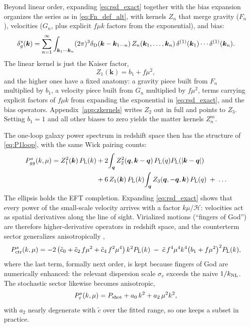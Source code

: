\documentclass[a4paper,11pt]{article}
\newcommand{\vq}{\bm{q}}
\newcommand{\vk}{\bm{k}}
\def\cH{\mathcal{H}}
\def\Plin{P_{\rm L}}
\def\knl{k_{\rm NL}}
\def\dirac{\delta_{\rm D}}
\numberwithin{equation}{section}
\begin{document}
Beyond linear order, expanding \eqref{eq:rsd_exact} together with the bias expansion organizes the series as in \eqref{eq:Fn_def_alt}, with kernels $Z_n$ that merge gravity ($F_n$), velocities ($G_n$, plus explicit $f\mu k$ factors from the exponential), and bias:
\begin{equation}
\delta_g^s(\vk) = \sum_{n=1}^{\infty}
\int_{\vk_1\cdots\vk_n}(2\pi)^3\dirac(\vk-\vk_{1\cdots n})\,
Z_n(\vk_1,\ldots,\vk_n)\,
\delta^{(1)}(\vk_1)\cdots\delta^{(1)}(\vk_n) .
\label{eq:Zn_expansion}
\end{equation}
The linear kernel is just the Kaiser factor,
\begin{equation}
Z_1(\vk) = b_1 + f\mu^2 ,
\label{eq:Z1}
\end{equation}
and the higher ones have a fixed anatomy: a gravity piece built from $F_n$ multiplied by $b_1$, a velocity piece built from $G_n$ multiplied by $f\mu^2$, terms carrying explicit factors of $f\mu k$ from expanding the exponential in \eqref{eq:rsd_exact}, and the bias operators. Appendix~\ref{app:zkernels} writes $Z_2$ out in full and points to $Z_3$. Setting $b_1 = 1$ and all other biases to zero yields the matter kernels $Z_n^m$.

The one-loop galaxy power spectrum in redshift space then has the structure of \eqref{eq:P1loop}, with the same Wick pairing counts:
\begin{align}
P_{gg}^{s}(k,\mu) = Z_1^2(\vk)\,\Plin(k)
&+ 2\!\int_{\vq} Z_2^2(\vq,\vk-\vq)\,\Plin(q)\Plin(|\vk-\vq|)
\notag\\
&+ 6\,Z_1(\vk)\,\Plin(k)\!\int_{\vq} Z_3(\vq,-\vq,\vk)\,\Plin(q)
\;+\; \ldots
\label{eq:Pgg_1loop}
\end{align}
The ellipsis holds the EFT completion. Expanding \eqref{eq:rsd_exact} shows that every power of the small-scale velocity arrives with a factor $k\mu/\cH$: velocities act as spatial derivatives along the line of sight. Virialized motions (``fingers of God'') are therefore higher-derivative operators in redshift space, and the counterterm sector generalizes anisotropically \cite{ChudaykinIvanov2019,ClassPT2020},
\begin{equation}
P_{\rm ctr}^{s}(k,\mu)
= -2\left(\tilde c_0 + \tilde c_2\,f\mu^2 + \tilde c_4\,f^2\mu^4\right)k^2\Plin(k)
\;-\; \tilde c\,f^4\mu^4k^4\big(b_1+f\mu^2\big)^2\Plin(k) ,
\label{eq:rsd_ctr}
\end{equation}
where the last term, formally next order, is kept because fingers of God are numerically enhanced: the relevant dispersion scale $\sigma_v$ exceeds the naive $1/\knl$. The stochastic sector likewise becomes anisotropic,
\begin{equation}
P_{\varepsilon}^{s}(k,\mu) = P_{\rm shot} + a_0\,k^2 + a_2\,\mu^2k^2 ,
\label{eq:rsd_stoch}
\end{equation}
with $a_2$ nearly degenerate with $\tilde c$ over the fitted range, so one keeps a subset in practice.
\end{document}
